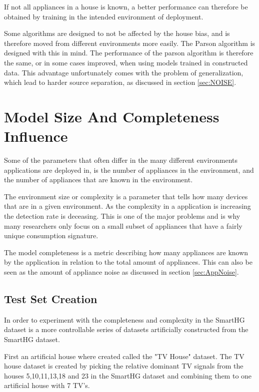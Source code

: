 If not all appliances in a house is known, a better performance can therefore be obtained by training in the intended environment of deployment. 

Some algorithms are designed to not be affected by the house bias, and is therefore moved from different environments more easily. The Parson algorithm is designed with this in mind. The performance of the parson algorithm is therefore the same, or in some cases improved, when using models trained in constructed data. This advantage unfortunately comes with the problem of generalization, which lead to harder source separation, as discussed in section \ref{sec:NOISE}. 


\section{Model Size And Completeness Influence }
Some of the parameters that often differ in the many different environments  applications are deployed in, is the number of appliances in the environment, and the number of appliances that are known in the environment.  

The environment size or complexity is a parameter that tells how many devices that are in a given environment. As the complexity in a  application is increasing the detection rate is deceasing\citep{RefWorks:34}. This is one of the major problems and is why many researchers only focus on a small subset of appliances that have a fairly unique consumption signature. 

The model completeness is a metric describing how many appliances are known by the application in relation to the total amount of appliances. This can also be seen as the amount of appliance noise as discussed in section \ref{sec:AppNoise}.

\subsection{Test Set Creation}
\label{sec:datasetCreation}
In order to experiment with the completeness and complexity in the SmartHG dataset is a more controllable series of datasets artificially constructed from the SmartHG dataset. 

First an artificial house where created called the "TV House" dataset. The TV house dataset is created by picking the relative dominant TV signals from the houses 5,10,11,13,18 and 23 in the SmartHG dataset and combining them to one artificial house with 7 TV's. 

